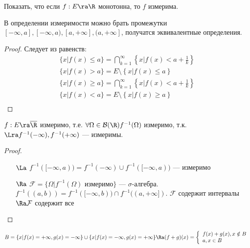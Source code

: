 \begin{problem}
    Показать, что если \(f: E \ra \R\) монотонна, то \(f\) измерима.
\end{problem}

\begin{note}
    В определении измеримости можно брать промежутки \([-\infty, a], [-\infty, a), [a, +\infty], (a, +\infty]\), получатся эквивалентные определения.
\end{note}
\begin{proof}
    Следует из равенств:
    \[\begin{array}{c}
        \{x | f(x) \le a\} = \bigcap_{k = 1}^\infty \left\{x | f(x) < a + \frac{1}{k}\right\} \\
        \{x | f(x) > a\} = E \setminus \left\{x | f(x) \le a\right\} \\
        \{x | f(x) \ge a\} = \bigcap_{k = 1}^\infty \left\{x | f(x) < a + \frac{1}{k}\right\} \\
        \{x | f(x) < a\} = E \setminus \left\{x | f(x) \ge a\right\} \\
    \end{array}\]
\end{proof}

\begin{lemma}
    \(f: E \ra \overline{\R}\) измеримо, т.е. \(\forall \Omega \in \mathcal{B}(\R) f^{-1}(\Omega)\) измеримо, т.к. \(\Lra f^{-1}(-\infty), f^{-1}(+\infty)\) --- измеримы.
\end{lemma}
\begin{proof}\indent
    \begin{enumerate}
        \item[\(\La\)] \(f^{-1}([-\infty, a)) = f^{-1}(-\infty) \cup f^{-1}([-\infty, a))\) --- измеримо
        \item[\(\Ra\)] \(\mathcal{F} = \{\Omega | f^{-1}(\Omega)\text{ измеримо}\}\) --- \(\sigma\)-алгебра. \(f^{-1}((a, b)) = f^{-1}([-\infty, b)) \cap f^{-1}((a, +\infty])\). \(\mathcal{F}\) содержит интервалы \(\Ra \mathcal{F}\) содержит все 
    \end{enumerate}    
\end{proof}

\begin{note}
    \(B = \{x | f(x) = +\infty, g(x) = -\infty\} \cup \{x | f(x) = -\infty, g(x) = +\infty\} \Ra (f + g)(x) = \left\{\begin{array}{l}
        f(x) + g(x), x \notin B \\
        a, x \in B
    \end{array}\right.\)
\end{note}